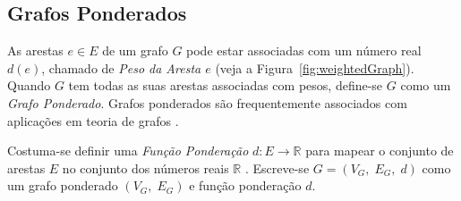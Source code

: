 \subsection*{Grafos Ponderados}

As arestas $e\in E$ de um grafo $G$ pode estar associadas com um número real $d(e)$, chamado de \textit{Peso da Aresta $e$} (veja a Figura~\ref{fig:weightedGraph}). Quando $G$ tem todas as suas arestas associadas com pesos, define-se $G$ como um \textit{Grafo Ponderado}. Grafos ponderados são frequentemente associados com aplicações em teoria de grafos \cite{grafosPremioElon}.

Costuma-se definir uma \textit{Função Ponderação} $d: E \longrightarrow \mathbb{R}$ para mapear o conjunto de arestas $E$ no conjunto dos números reais $\mathbb{R}$ \cite{libertiEDG}. Escreve-se $G = (V_G,\;E_G,\;d)$ como um grafo ponderado $(V_G,\; E_G)$ e função ponderação $d$.


